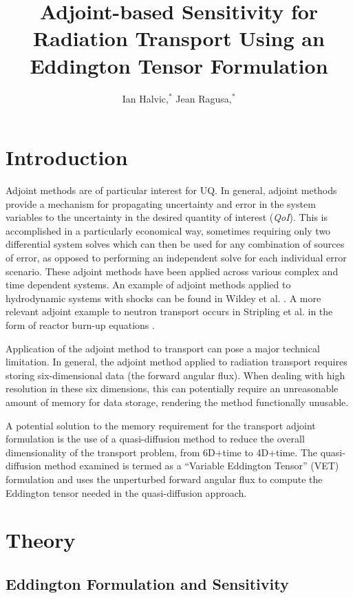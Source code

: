 \documentclass{anstrans}
\title{Adjoint-based Sensitivity for Radiation Transport Using an Eddington Tensor Formulation}
\author{Ian Halvic,$^{*}$ Jean Ragusa,$^{*}$}
\institute{
$^{*}$ Texas A\&M University,
College Station, TX, iwhalvic@tamu.edu}
\newcommand{\qoi}{{\it QoI}\xspace}
\begin{document}
\section{Introduction}


Adjoint methods are of particular interest for UQ. In general, adjoint methods provide a mechanism for propagating uncertainty and error in the system variables to the uncertainty in the desired quantity of interest (\qoi). This is accomplished in a particularly economical way, sometimes requiring only two differential system solves which can then be used for any combination of sources of error, as opposed to performing an independent solve for each individual error scenario. These adjoint methods have been applied across various complex and time dependent systems. An example of adjoint methods applied to hydrodynamic systems with shocks can be found in Wildey et al. \cite{Wildey}. A more relevant adjoint example to neutron transport occurs in Stripling et al. in the form of reactor burn-up equations \cite{Stripling}.


Application of the adjoint method to transport can pose a major technical limitation. In general, the adjoint method applied to radiation transport requires storing six-dimensional data (the forward angular flux). When dealing with high resolution in these six dimensions, this can potentially require an unreasonable amount of memory for data storage, rendering the method functionally unusable. 

A potential solution to the memory requirement for the transport adjoint formulation is the use of a quasi-diffusion method to reduce the overall dimensionality of the transport problem, from 6D+time to 4D+time. The quasi-diffusion method examined is termed  as a ``Variable Eddington Tensor'' (VET) formulation and uses the unperturbed forward angular flux to compute the Eddington tensor needed in the quasi-diffusion approach. 
\section{Theory}
\subsection{Eddington Formulation and Sensitivity}
\end{document}
